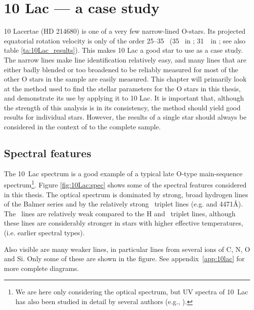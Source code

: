 \chapter{10 Lac --- a case study}
\label{ch:casestudy}


10 Lacertae (HD 214680) is one of a very few narrow-lined O-stars. Its
projected equatorial rotation velocity is only of the order 25--35
\kms\ (35 \kms\ in 
\cite{ho:xcorr}; 31~\kms\ in \cite{pe:xcorr}; see also table 
\ref{ta:10Lac_results}). This makes 10 Lac a good star to use as
a case study. The narrow lines make line identification relatively
easy, and many lines that are either badly blended or too broadened to
be reliably measured for most of the other O stars in the sample are easily
measured. This chapter will primarily look at the method used to find
the stellar parameters for the O stars in this thesis, and demonstrate
its use by applying it to 10 Lac. It is important that, although the
strength of this analysis is in its consistency, the method should
yield good results for individual stars. However, the results of a single
star should always be considered in the context of to the complete sample.

\section{Spectral features}

The 10~Lac spectrum is a good example of a typical late O-type
main-sequence spectrum\footnote{We are here only considering the
optical spectrum, but UV spectra of 10~Lac has also been studied in
detail by several authors (e.g., \cite{wa:96}).}. Figure
\ref{fig:10Lac:spec} shows some of the spectral features considered in
this thesis. The optical spectrum is dominated by strong, broad
hydrogen lines of the Balmer series and by the relatively strong \hei\
triplet lines (e.g. \lam{} and 4471\AA). The \heii\ lines are
relatively weak compared to the H and \hei\ triplet lines, although
these lines are considerably stronger in stars with higher effective
temperatures, \teff (i.e. earlier spectral types).

Also visible are many weaker lines, in particular lines from several
ions of C, N, O and Si. Only some of these are shown in the figure.
See appendix~\ref{app:10lac} for more complete diagrams. 

